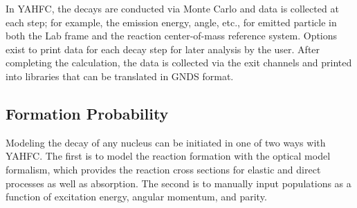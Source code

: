\documentclass[
10pt,
showpacs,preprintnumbers,footinbib,
amsfonts,amsmath,amssymb,
aps,
prc,twocolumn,groupedaddress,superscriptaddress,
showkeys,
nofootinbib
]{revtex4-1}
\begin{document}
In YAHFC, the decays are conducted via Monte Carlo and data is collected at each step; for example, the emission energy, angle, etc., for emitted particle in both the Lab frame and the reaction center-of-mass reference system. Options exist to print data for each decay step for later analysis by the user. After completing the calculation, the data is collected via the exit channels and printed into libraries that can be translated in GNDS format.

\subsection{Formation Probability}
Modeling the decay of any nucleus can be initiated in one of two ways with YAHFC. The first is to model the reaction formation with the optical model formalism, which provides the reaction cross sections for elastic and direct processes as well as absorption. The second is to manually input populations as a function of excitation energy, angular momentum, and parity.
\end{document}

